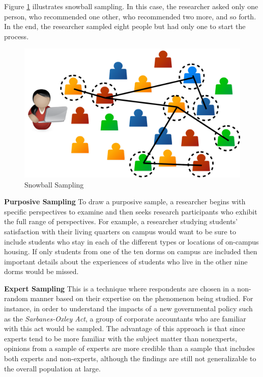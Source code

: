 Figure \ref{07:fig09} illustrates snowball sampling. In this case, the researcher asked only one person, who recommended one other, who recommended two more, and so forth. In the end, the researcher sampled eight people but had only one to start the process.

\begin{figure}[H]
	\centering
	\includegraphics[width=\maxwidth{.35\linewidth}]{gfx/07-09}
	\caption{Snowball Sampling}
	\label{07:fig09}
\end{figure}

\textbf{Purposive Sampling} To draw a purposive sample, a researcher begins with specific perspectives to examine and then seeks research participants who exhibit the full range of perspectives. For example, a researcher studying students' satisfaction with their living quarters on campus would want to be sure to include students who stay in each of the different types or locations of on-campus housing. If only students from one of the ten dorms on campus are included then important details about the experiences of students who live in the other nine dorms would be missed. 

\textbf{Expert Sampling} This is a technique where respondents are chosen in a non-random manner based on their expertise on the phenomenon being studied. For instance, in order to understand the impacts of a new governmental policy such as the \textit{Sarbanes-Oxley Act}, a group of corporate accountants who are familiar with this act would be sampled. The advantage of this approach is that since experts tend to be more familiar with the subject matter than nonexperts, opinions from a sample of experts are more credible than a sample that includes both experts and non-experts, although the findings are still not generalizable to the overall population at large.

